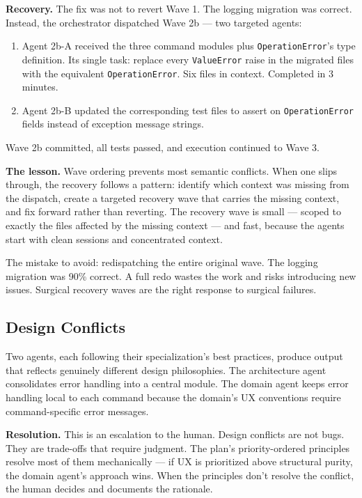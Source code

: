 \documentclass[
  a4paper,
  DIV=11,
  numbers=noendperiod]{scrreprt}
\providecommand{\tightlist}{%
  \setlength{\itemsep}{0pt}\setlength{\parskip}{0pt}}
\begin{document}
\textbf{Recovery.} The fix was not to revert Wave 1. The logging
migration was correct. Instead, the orchestrator dispatched Wave 2b ---
two targeted agents:

\begin{enumerate}
\def\labelenumi{\arabic{enumi}.}
\tightlist
\item
  Agent 2b-A received the three command modules plus
  \texttt{OperationError}'s type definition. Its single task: replace
  every \texttt{ValueError} raise in the migrated files with the
  equivalent \texttt{OperationError}. Six files in context. Completed in
  3 minutes.
\item
  Agent 2b-B updated the corresponding test files to assert on
  \texttt{OperationError} fields instead of exception message strings.
\end{enumerate}

Wave 2b committed, all tests passed, and execution continued to Wave 3.

\textbf{The lesson.} Wave ordering prevents most semantic conflicts.
When one slips through, the recovery follows a pattern: identify which
context was missing from the dispatch, create a targeted recovery wave
that carries the missing context, and fix forward rather than reverting.
The recovery wave is small --- scoped to exactly the files affected by
the missing context --- and fast, because the agents start with clean
sessions and concentrated context.

The mistake to avoid: redispatching the entire original wave. The
logging migration was 90\% correct. A full redo wastes the work and
risks introducing new issues. Surgical recovery waves are the right
response to surgical failures.

\subsection{Design Conflicts}\label{design-conflicts}

Two agents, each following their specialization's best practices,
produce output that reflects genuinely different design philosophies.
The architecture agent consolidates error handling into a central
module. The domain agent keeps error handling local to each command
because the domain's UX conventions require command-specific error
messages.

\textbf{Resolution.} This is an escalation to the human. Design
conflicts are not bugs. They are trade-offs that require judgment. The
plan's priority-ordered principles resolve most of them mechanically ---
if UX is prioritized above structural purity, the domain agent's
approach wins. When the principles don't resolve the conflict, the human
decides and documents the rationale.
\end{document}
